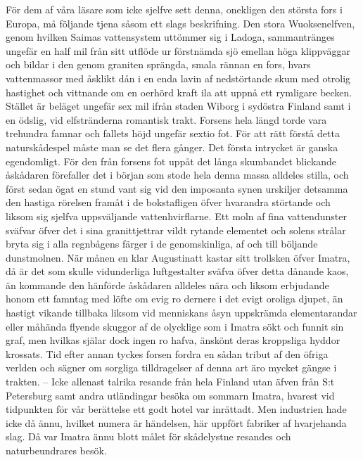 För dem af våra läsare som icke sjelfve sett denna, onekligen den
största fors i Europa, må följande tjena såsom ett slags beskrifning.
Den stora Wuoksenelfven, genom hvilken Saimas vattensystem uttömmer sig
i Ladoga, sammantränges ungefär en half mil från sitt utflöde ur
förstnämda sjö emellan höga klippväggar och bildar i den genom graniten
sprängda, smala rännan en fors, hvars vattenmassor med åsklikt dån i en
enda lavin af nedstörtande skum med otrolig hastighet och vittnande om
en oerhörd kraft ila att uppnå ett rymligare becken. Stället är beläget
ungefär sex mil ifrån staden Wiborg i sydöstra Finland samt i en ödslig,
vid elfstränderna romantisk trakt. Forsens hela längd torde vara
trehundra famnar och fallets höjd ungefär sextio fot. För att rätt
förstå detta naturskådespel måste man se det flera gånger. Det första
intrycket är ganska egendomligt. För den från forsens fot uppåt det
långa skumbandet blickande åskådaren förefaller det i början som stode
hela denna massa alldeles stilla, och först sedan ögat en stund vant sig
vid den imposanta synen urskiljer detsamma den hastiga rörelsen framåt i
de bokstafligen öfver hvarandra störtande och liksom sig sjelfva
uppsväljande vattenhvirflarne. Ett moln af fina vattendunster sväfvar
öfver det i sina granittjettrar vildt rytande elementet och solens
strålar bryta sig i alla regnbågens färger i de genomskinliga, af och
till böljande dunstmolnen. När månen en klar Augustinatt kastar sitt
trollsken öfver Imatra, då är det som skulle vidunderliga luftgestalter
sväfva öfver detta dånande kaos, än kommande den hänförde åskådaren
alldeles nära och liksom erbjudande honom ett famntag med löfte om evig
ro dernere i det evigt oroliga djupet, än hastigt vikande tillbaka
liksom vid menniskans åsyn uppskrämda elementarandar eller måhända
flyende skuggor af de olycklige som i Imatra sökt och funnit sin graf,
men hvilkas själar dock ingen ro hafva, änskönt deras kroppsliga hyddor
krossats. Tid efter annan tyckes forsen fordra en sådan tribut af den
öfriga verlden och sägner om sorgliga tilldragelser af denna art äro
mycket gängse i trakten. -- Icke allenast talrika resande från hela
Finland utan äfven från S:t Petersburg samt andra utländingar besöka om
sommarn Imatra, hvarest vid tidpunkten för vår berättelse ett godt hotel
var inrättadt. Men industrien hade icke då ännu, hvilket numera är
händelsen, här uppfört fabriker af hvarjehanda slag. Då var Imatra ännu
blott målet för skådelystne resandes och naturbeundrares besök.

